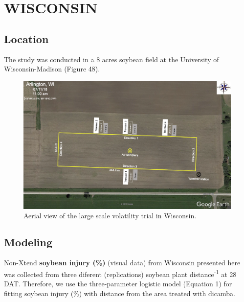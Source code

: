 \documentclass[]{article}
\begin{document}
\newpage

\pagebreak

\section{WISCONSIN}\label{wisconsin-1}

\subsection{Location}\label{location-5}

The study was conducted in a 8 acres soybean field at the University of
Wisconsin-Madison (Figure 48).

\begin{figure}[h]

{\centering \includegraphics[width=1\linewidth]{Wisconsin} 

}

\caption{Aerial view of the large scale volatility trial in Wisconsin.}\label{fig:unnamed-chunk-95}
\end{figure}

\pagebreak

\subsection{Modeling}\label{modeling-5}

Non-Xtend \textbf{soybean injury (\%)} (visual data) from Wisconsin
presented here was collected from three diferent (replications) soybean
plant distance\textsuperscript{-1} at 28 DAT. Therefore, we use the
three-parameter logistic model (Equation 1) for fitting soybean injury
(\%) with distance from the area treated with dicamba.
\end{document}
